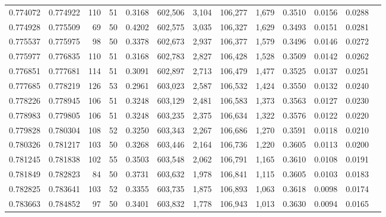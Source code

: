 \begin{tabular}{rrrrrrrrrrrrr}
0.774072 & 0.774922 &   110 &  51 &                                     0.3168 & 602,506 &   3,104 & 106,277 &   1,679 & 0.3510 & 0.0156 & 0.0288 \\
0.774928 & 0.775509 &    69 &  50 &                                     0.4202 & 602,575 &   3,035 & 106,327 &   1,629 & 0.3493 & 0.0151 & 0.0281 \\
0.775537 & 0.775975 &    98 &  50 &                                     0.3378 & 602,673 &   2,937 & 106,377 &   1,579 & 0.3496 & 0.0146 & 0.0272 \\
0.775977 & 0.776835 &   110 &  51 &                                     0.3168 & 602,783 &   2,827 & 106,428 &   1,528 & 0.3509 & 0.0142 & 0.0262 \\
0.776851 & 0.777681 &   114 &  51 &                                     0.3091 & 602,897 &   2,713 & 106,479 &   1,477 & 0.3525 & 0.0137 & 0.0251 \\
0.777685 & 0.778219 &   126 &  53 &                                     0.2961 & 603,023 &   2,587 & 106,532 &   1,424 & 0.3550 & 0.0132 & 0.0240 \\
0.778226 & 0.778945 &   106 &  51 &                                     0.3248 & 603,129 &   2,481 & 106,583 &   1,373 & 0.3563 & 0.0127 & 0.0230 \\
0.778983 & 0.779805 &   106 &  51 &                                     0.3248 & 603,235 &   2,375 & 106,634 &   1,322 & 0.3576 & 0.0122 & 0.0220 \\
0.779828 & 0.780304 &   108 &  52 &                                     0.3250 & 603,343 &   2,267 & 106,686 &   1,270 & 0.3591 & 0.0118 & 0.0210 \\
0.780326 & 0.781217 &   103 &  50 &                                     0.3268 & 603,446 &   2,164 & 106,736 &   1,220 & 0.3605 & 0.0113 & 0.0200 \\
0.781245 & 0.781838 &   102 &  55 &                                     0.3503 & 603,548 &   2,062 & 106,791 &   1,165 & 0.3610 & 0.0108 & 0.0191 \\
0.781849 & 0.782823 &    84 &  50 &                                     0.3731 & 603,632 &   1,978 & 106,841 &   1,115 & 0.3605 & 0.0103 & 0.0183 \\
0.782825 & 0.783641 &   103 &  52 &                                     0.3355 & 603,735 &   1,875 & 106,893 &   1,063 & 0.3618 & 0.0098 & 0.0174 \\
0.783663 & 0.784852 &    97 &  50 &                                     0.3401 & 603,832 &   1,778 & 106,943 &   1,013 & 0.3630 & 0.0094 & 0.0165 \\

\end{tabular}
